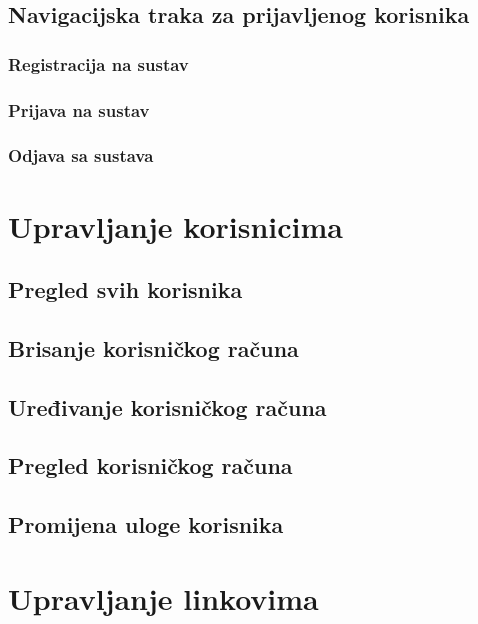 \documentclass[times, utf8, zavrsni]{fer}
\begin{document}
\subsection{Navigacijska traka za prijavljenog korisnika}

\subsubsection{Registracija na sustav}

\subsubsection{Prijava na sustav}

\subsubsection{Odjava sa sustava}

\section{Upravljanje korisnicima}

\subsection{Pregled svih korisnika}

\subsection{Brisanje korisničkog računa}

\subsection{Uređivanje korisničkog računa}

\subsection{Pregled korisničkog računa}

\subsection{Promijena uloge korisnika}

\section{Upravljanje linkovima}
\end{document}
